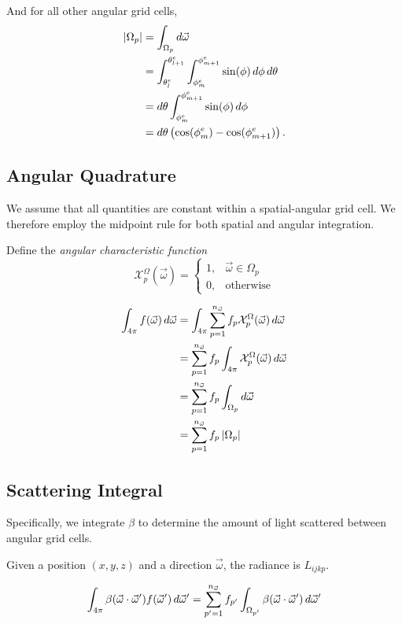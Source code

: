 And for all other angular grid cells,
\begin{align}
  \left| \Omega_p \right| &= \int_{\Omega_p} d{\vec{\omega}} \\
                 &= \int_{\theta_l^e}^{\theta_{l+1}^e}\int_{\phi_m^e}^{\phi_{m+1}^e} \sin(\phi)\, d\phi\, d\theta \\
                 &= d\theta \int_{\phi_m^e}^{\phi_{m+1}^e} \sin(\phi)\, d\phi \\
                 &= d\theta\left( \cos(\phi_m^e)-\cos(\phi_{m+1}^e) \right).
\end{align}


\subsection{Angular Quadrature}
We assume that all quantities are constant within a spatial-angular grid cell.
We therefore employ the midpoint rule for both spatial and angular integration.

Define the \textit{angular characteristic function}
\begin{equation}
  \mathcal{X}^\Omega_p(\vec{\omega}) = \begin{cases}
    1, & \vec{\omega} \in \Omega_p \\
    0, & \mbox{otherwise}
  \end{cases}
\end{equation}

\begin{align}
  \int_{4\pi} f(\vec{\omega})\, d\vec{\omega} &= \int_{4\pi} \sum_{p=1}^{n_{\vec{\omega}}} f_p \mathcal{X}^\Omega_p(\vec{\omega})\, d\vec{\omega} \\
  &= \sum_{p=1}^{n_{\vec{\omega}}} f_p \int_{4\pi} \mathcal{X}^\Omega_p(\vec{\omega})\, d\vec{\omega} \\
  &= \sum_{p=1}^{n_{\vec{\omega}}} f_p \int_{\Omega_p} d\vec{\omega} \\
  &= \sum_{p=1}^{n_{\vec{\omega}}} f_p \left| \Omega_p \right|
\end{align}

 \subsection{Scattering Integral}

Specifically, we integrate $\beta$ to determine the amount of light scattered between angular grid cells.

Given a position $(x,y,z)$ and a direction $\vec{\omega}$, the radiance is $L_{ijkp}$.

\begin{align}
  \int_{4\pi}\beta(\vec{\omega} \cdot \vec{\omega}')f(\vec{\omega}')\, d\vec{\omega}' &= \sum_{p'=1}^{n_{\vec{\omega}}} f_{p'} \int_{\Omega_{p'}} \beta(\vec{\omega} \cdot \vec{\omega}')\, d\vec{\omega}' \\
\end{align}

